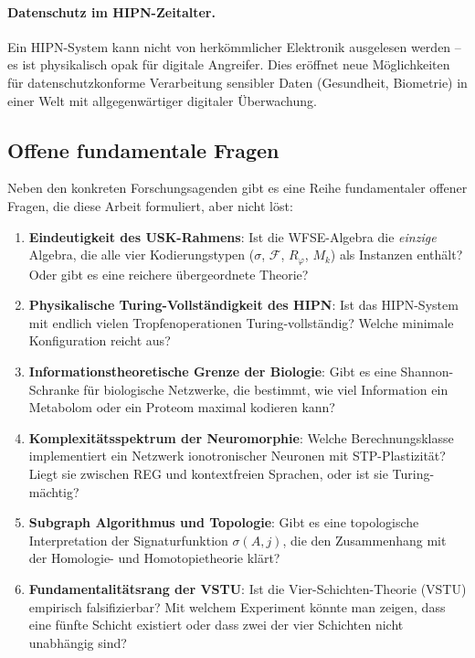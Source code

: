 ﻿\documentclass[a4paper,12pt]{scrreprt}
\theoremstyle{definition}
\begin{document}
\paragraph{Datenschutz im HIPN-Zeitalter.}
Ein HIPN-System kann nicht von herkömmlicher Elektronik ausgelesen
werden -- es ist physikalisch opak für digitale Angreifer. Dies
eröffnet neue Möglichkeiten für datenschutzkonforme Verarbeitung
sensibler Daten (Gesundheit, Biometrie) in einer Welt mit
allgegenwärtiger digitaler Überwachung.

\subsection{Offene fundamentale Fragen}

Neben den konkreten Forschungsagenden gibt es eine Reihe
fundamentaler offener Fragen, die diese Arbeit formuliert, aber nicht
löst:

\begin{enumerate}
  \item \textbf{Eindeutigkeit des USK-Rahmens}: Ist die WFSE-Algebra
    die \emph{einzige} Algebra, die alle vier Kodierungstypen
    ($\sigma$, $\mathcal{F}$, $R_\varphi$, $M_k$) als Instanzen
    enthält? Oder gibt es eine reichere übergeordnete Theorie?
  \item \textbf{Physikalische Turing-Vollständigkeit des HIPN}:
    Ist das HIPN-System mit endlich vielen Tropfenoperationen
    Turing-vollständig? Welche minimale Konfiguration reicht aus?
  \item \textbf{Informationstheoretische Grenze der Biologie}:
    Gibt es eine Shannon-Schranke für biologische Netzwerke,
    die bestimmt, wie viel Information ein Metabolom oder ein
    Proteom maximal kodieren kann?
  \item \textbf{Komplexitätsspektrum der Neuromorphie}:
    Welche Berechnungsklasse implementiert ein Netzwerk ionotronischer
    Neuronen mit STP-Plastizität? Liegt sie zwischen REG und
    kontextfreien Sprachen, oder ist sie Turing-mächtig?
  \item \textbf{Subgraph Algorithmus und Topologie}:
    Gibt es eine topologische Interpretation der Signaturfunktion
    $\sigma(A,j)$, die den Zusammenhang mit der Homologie- und
    Homotopietheorie klärt?
  \item \textbf{Fundamentalitätsrang der VSTU}:
    Ist die Vier-Schichten-Theorie (VSTU) empirisch falsifizierbar?
    Mit welchem Experiment könnte man zeigen, dass eine fünfte
    Schicht existiert oder dass zwei der vier Schichten nicht
    unabhängig sind?
\end{enumerate}
\end{document}
